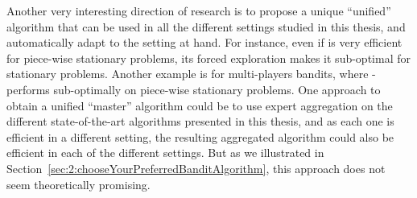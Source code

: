 Another very interesting direction of research is to propose a unique ``unified'' algorithm that can be used in all the different settings studied in this thesis, and automatically adapt to the setting at hand.
For instance, even if \GLRklUCB{} is very efficient for piece-wise stationary problems, its forced exploration makes it sub-optimal for stationary problems.
Another example is for multi-players bandits, where \MCTopM-\klUCB{} performs sub-optimally on piece-wise stationary problems.
One approach to obtain a unified ``master'' algorithm could be to use expert aggregation on the different state-of-the-art algorithms presented in this thesis, and as each one is efficient in a different setting, the resulting aggregated algorithm could also be efficient in each of the different settings.
But as we illustrated in Section~\ref{sec:2:chooseYourPreferredBanditAlgorithm}, this approach does not seem theoretically promising.





